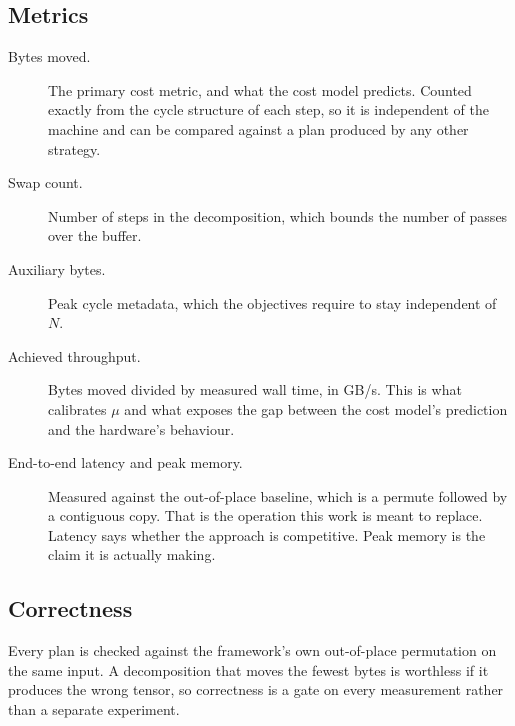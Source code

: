 \subsection{Metrics}

\begin{description}
\item[Bytes moved.] The primary cost metric, and what the cost model
  predicts. Counted exactly from the cycle structure of each step, so it is
  independent of the machine and can be compared against a plan produced by
  any other strategy.
\item[Swap count.] Number of steps in the decomposition, which bounds the
  number of passes over the buffer.
\item[Auxiliary bytes.] Peak cycle metadata, which the objectives require to
  stay independent of $N$.
\item[Achieved throughput.] Bytes moved divided by measured wall time, in
  GB/s. This is what calibrates $\mu$ and what exposes the gap between the
  cost model's prediction and the hardware's behaviour.
\item[End-to-end latency and peak memory.] Measured against the out-of-place
  baseline, which is a permute followed by a contiguous copy. That is the
  operation this work is meant to replace. Latency says whether the approach
  is competitive. Peak memory is the claim it is actually making.
\end{description}

\subsection{Correctness}

Every plan is checked against the framework's own out-of-place permutation on
the same input. A decomposition that moves the fewest bytes is worthless if it
produces the wrong tensor, so correctness is a gate on every measurement
rather than a separate experiment.

